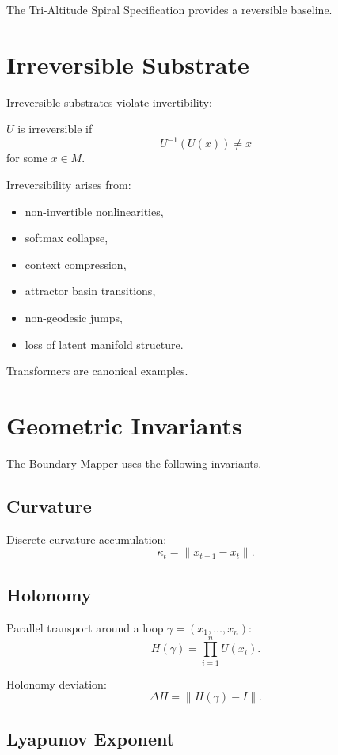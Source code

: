 \documentclass[11pt]{article}
\begin{document}
The Tri-Altitude Spiral Specification provides a reversible baseline.

\section{Irreversible Substrate}

Irreversible substrates violate invertibility:

\begin{definition}
$U$ is irreversible if
\[
U^{-1}(U(x)) \neq x
\]
for some $x \in M$.
\end{definition}

Irreversibility arises from:

\begin{itemize}
    \item non-invertible nonlinearities,
    \item softmax collapse,
    \item context compression,
    \item attractor basin transitions,
    \item non-geodesic jumps,
    \item loss of latent manifold structure.
\end{itemize}

Transformers are canonical examples.

\section{Geometric Invariants}

The Boundary Mapper uses the following invariants.

\subsection{Curvature}

Discrete curvature accumulation:
\[
\kappa_t = \|x_{t+1} - x_t\|.
\]

\subsection{Holonomy}

Parallel transport around a loop $\gamma = (x_1, \dots, x_n)$:
\[
H(\gamma) = \prod_{i=1}^n U(x_i).
\]

Holonomy deviation:
\[
\Delta H = \|H(\gamma) - I\|.
\]

\subsection{Lyapunov Exponent}
\end{document}
